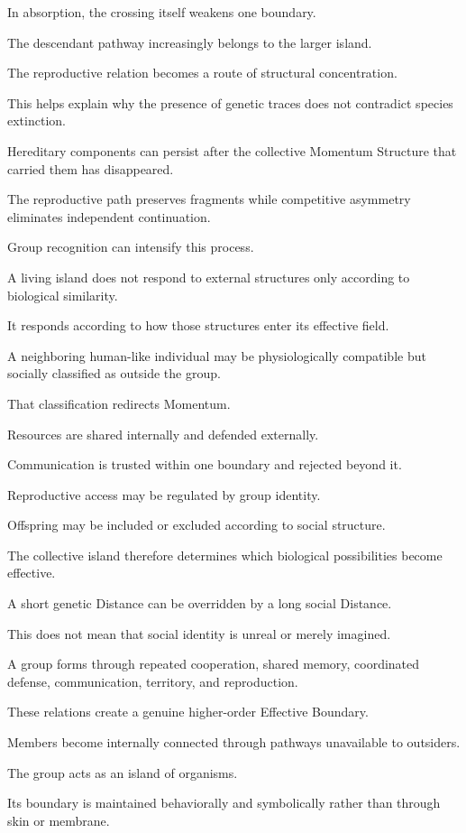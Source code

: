 In absorption, the crossing itself weakens one boundary.

The descendant pathway increasingly belongs to the larger island.

The reproductive relation becomes a route of structural concentration.

This helps explain why the presence of genetic traces does not contradict species extinction.

Hereditary components can persist after the collective Momentum Structure that carried them has disappeared.

The reproductive path preserves fragments while competitive asymmetry eliminates independent continuation.

Group recognition can intensify this process.

A living island does not respond to external structures only according to biological similarity.

It responds according to how those structures enter its effective field.

A neighboring human-like individual may be physiologically compatible but socially classified as outside the group.

That classification redirects Momentum.

Resources are shared internally and defended externally.

Communication is trusted within one boundary and rejected beyond it.

Reproductive access may be regulated by group identity.

Offspring may be included or excluded according to social structure.

The collective island therefore determines which biological possibilities become effective.

A short genetic Distance can be overridden by a long social Distance.

This does not mean that social identity is unreal or merely imagined.

A group forms through repeated cooperation, shared memory, coordinated defense, communication, territory, and reproduction.

These relations create a genuine higher-order Effective Boundary.

Members become internally connected through pathways unavailable to outsiders.

The group acts as an island of organisms.

Its boundary is maintained behaviorally and symbolically rather than through skin or membrane.

